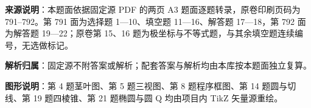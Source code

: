 

\begin{gknotice}
\textbf{来源说明}：本题面依据固定源 PDF 的两页 A3 题面逐题转录，原卷印刷页码为 791–792。第 791 面为选择题 1—10、填空题 11—16、解答题 17—18，第 792 面为解答题 19—22；原卷第 15、16 题为极坐标与不等式题，与其余填空题连续编号，无选做标记。

\textbf{解析归属}：固定源不附答案或解析；配套答案与解析均由本库按本题面独立复算。

\textbf{图形说明}：第 4 题茎叶图、第 5 题三视图、第 8 题程序框图、第 14 题圆与切线、第 19 题四棱锥、第 21 题椭圆与圆 Q 均由项目内 TikZ 矢量源重绘。
\end{gknotice}


